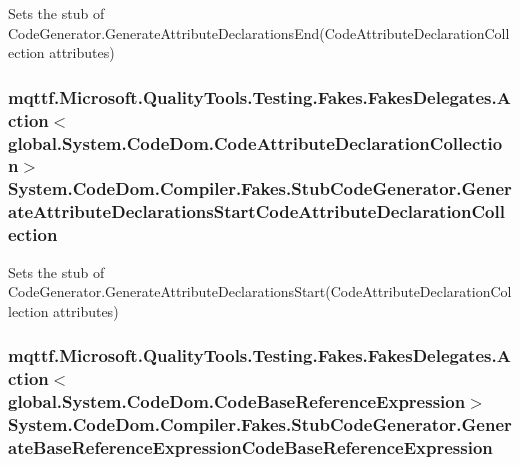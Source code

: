 Sets the stub of Code\-Generator.\-Generate\-Attribute\-Declarations\-End(\-Code\-Attribute\-Declaration\-Collection attributes)

\hypertarget{class_system_1_1_code_dom_1_1_compiler_1_1_fakes_1_1_stub_code_generator_a62120e95fe139c6ff5a380f72b9bc724}{
\subsubsection[{Generate\-Attribute\-Declarations\-Start\-Code\-Attribute\-Declaration\-Collection}]{\setlength{\rightskip}{0pt plus 5cm}mqttf.\-Microsoft.\-Quality\-Tools.\-Testing.\-Fakes.\-Fakes\-Delegates.\-Action$<$global.\-System.\-Code\-Dom.\-Code\-Attribute\-Declaration\-Collection$>$ System.\-Code\-Dom.\-Compiler.\-Fakes.\-Stub\-Code\-Generator.\-Generate\-Attribute\-Declarations\-Start\-Code\-Attribute\-Declaration\-Collection}}\label{class_system_1_1_code_dom_1_1_compiler_1_1_fakes_1_1_stub_code_generator_a62120e95fe139c6ff5a380f72b9bc724}


Sets the stub of Code\-Generator.\-Generate\-Attribute\-Declarations\-Start(\-Code\-Attribute\-Declaration\-Collection attributes)

\hypertarget{class_system_1_1_code_dom_1_1_compiler_1_1_fakes_1_1_stub_code_generator_a976ea426a0010f701f16a96631df6bd9}{
\subsubsection[{Generate\-Base\-Reference\-Expression\-Code\-Base\-Reference\-Expression}]{\setlength{\rightskip}{0pt plus 5cm}mqttf.\-Microsoft.\-Quality\-Tools.\-Testing.\-Fakes.\-Fakes\-Delegates.\-Action$<$global.\-System.\-Code\-Dom.\-Code\-Base\-Reference\-Expression$>$ System.\-Code\-Dom.\-Compiler.\-Fakes.\-Stub\-Code\-Generator.\-Generate\-Base\-Reference\-Expression\-Code\-Base\-Reference\-Expression}}\label{class_system_1_1_code_dom_1_1_compiler_1_1_fakes_1_1_stub_code_generator_a976ea426a0010f701f16a96631df6bd9}


